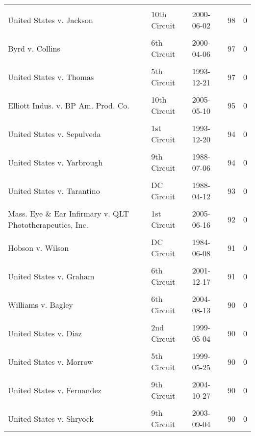 \documentclass[10pt, letterpaper]{article}
\begin{document}
\begin{spacing}{1.0}
\begin{footnotesize}
\begin{longtable}[H]{p{3.5in}llrr}
        & & & &\\[-6pt]
        United States v. Jackson & 10th Circuit & 2000-06-02 & 98 & 0\\
        & & & &\\[-6pt]
        Byrd v. Collins & 6th Circuit & 2000-04-06 & 97 & 0\\
        & & & &\\[-6pt]
        United States v. Thomas & 5th Circuit & 1993-12-21 & 97 & 0\\
        & & & &\\[-6pt]
        Elliott Indus. v. BP Am. Prod. Co. & 10th Circuit & 2005-05-10 & 95 & 0\\
        & & & &\\[-6pt]
        United States v. Sepulveda & 1st Circuit & 1993-12-20 & 94 & 0\\
        & & & &\\[-6pt]
        United States v. Yarbrough & 9th Circuit & 1988-07-06 & 94 & 0\\
        & & & &\\[-6pt]
        United States v. Tarantino & DC Circuit & 1988-04-12 & 93 & 0\\
        & & & &\\[-6pt]
        Mass. Eye \& Ear Infirmary v. QLT Phototherapeutics, Inc. & 1st Circuit & 2005-06-16 & 92 & 0\\
        & & & &\\[-6pt]
        Hobson v. Wilson & DC Circuit & 1984-06-08 & 91 & 0\\
        & & & &\\[-6pt]
        United States v. Graham & 6th Circuit & 2001-12-17 & 91 & 0\\
        & & & &\\[-6pt]
        Williams v. Bagley & 6th Circuit & 2004-08-13 & 90 & 0\\
        & & & &\\[-6pt]
        United States v. Diaz & 2nd Circuit & 1999-05-04 & 90 & 0\\
        & & & &\\[-6pt]
        United States v. Morrow & 5th Circuit & 1999-05-25 & 90 & 0\\
        & & & &\\[-6pt]
        United States v. Fernandez & 9th Circuit & 2004-10-27 & 90 & 0\\
        & & & &\\[-6pt]
        United States v. Shryock & 9th Circuit & 2003-09-04 & 90 & 0\\

\end{longtable}
\end{footnotesize}
\end{spacing}
\end{document}
